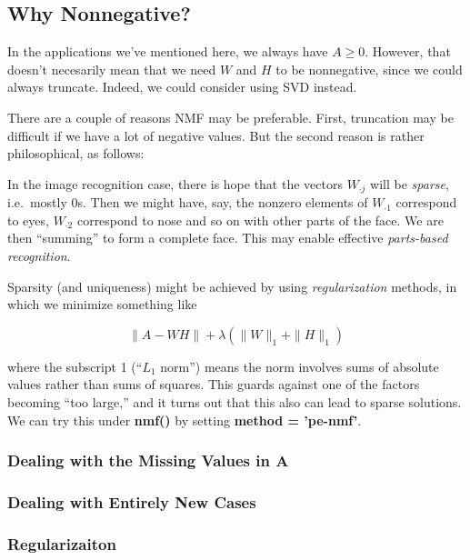 \subsection{Why Nonnegative?}

In the applications we've mentioned here, we always have $A \geq 0$.
However, that doesn't necesarily mean that we need $W$ and $H$ to be
nonnegative, since we could always truncate.  Indeed, we could consider
using SVD instead.

There are a couple of reasons NMF may be preferable.  First, truncation
may be difficult if we have a lot of negative values.  But the second
reason is rather philosophical, as follows:

In the image recognition case, there is hope that the vectors $W_{\cdot
j}$ will be {\it sparse}, i.e.\ mostly 0s. Then we might have, say, the
nonzero elements of $W_{\cdot 1}$ correspond to eyes, $W_{\cdot 2}$
correspond to nose and so on with other parts of the face.  We are then
``summing'' to form a complete face.  This may enable effective {\it
parts-based recognition}.

Sparsity (and uniqueness) might be achieved by using {\it
regularization} methods, in which we minimize something like

\begin{equation}
\|A - WH\| + \lambda (\|W\|_1 + \|H\|_1)
\end{equation}

where the subscript 1 (``$L_1$ norm'') means the norm involves sums of
absolute values rather than sums of squares.  This guards against one of
the factors becoming ``too large,'' and it turns out that this also can
lead to sparse solutions.  We can try this under {\bf nmf()}  by setting
{\bf method = 'pe-nmf'}.

\subsubsection{Dealing with the Missing Values in A}

\subsubsection{Dealing with Entirely New Cases}

\subsubsection{Regularizaiton}


